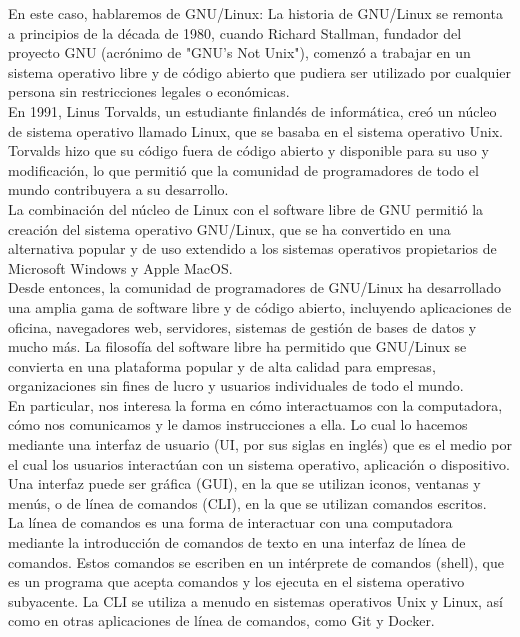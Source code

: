 \documentclass{article}
\begin{document}
En este caso, hablaremos de GNU/Linux: La historia de GNU/Linux se remonta a principios de la década de 1980, cuando Richard Stallman, fundador del proyecto GNU (acrónimo de "GNU's Not Unix"), comenzó a trabajar en un sistema operativo libre y de código abierto que pudiera ser utilizado por cualquier persona sin restricciones legales o económicas.\\

En 1991, Linus Torvalds, un estudiante finlandés de informática, creó un núcleo de sistema operativo llamado Linux, que se basaba en el sistema operativo Unix. Torvalds hizo que su código fuera de código abierto y disponible para su uso y modificación, lo que permitió que la comunidad de programadores de todo el mundo contribuyera a su desarrollo.\\

La combinación del núcleo de Linux con el software libre de GNU permitió la creación del sistema operativo GNU/Linux, que se ha convertido en una alternativa popular y de uso extendido a los sistemas operativos propietarios de Microsoft Windows y Apple MacOS.\\

Desde entonces, la comunidad de programadores de GNU/Linux ha desarrollado una amplia gama de software libre y de código abierto, incluyendo aplicaciones de oficina, navegadores web, servidores, sistemas de gestión de bases de datos y mucho más. La filosofía del software libre ha permitido que GNU/Linux se convierta en una plataforma popular y de alta calidad para empresas, organizaciones sin fines de lucro y usuarios individuales de todo el mundo.\\

En particular, nos interesa la forma en cómo interactuamos con la computadora, cómo nos comunicamos y le damos instrucciones a ella. Lo cual lo hacemos mediante una interfaz de usuario (UI, por sus siglas en inglés) que es el medio por el cual los usuarios interactúan con un sistema operativo, aplicación o dispositivo. Una interfaz puede ser gráfica (GUI), en la que se utilizan iconos, ventanas y menús, o de línea de comandos (CLI), en la que se utilizan comandos escritos.\\

La línea de comandos es una forma de interactuar con una computadora mediante la introducción de comandos de texto en una interfaz de línea de comandos. Estos comandos se escriben en un intérprete de comandos (shell), que es un programa que acepta comandos y los ejecuta en el sistema operativo subyacente. La CLI se utiliza a menudo en sistemas operativos Unix y Linux, así como en otras aplicaciones de línea de comandos, como Git y Docker.\\
\end{document}
